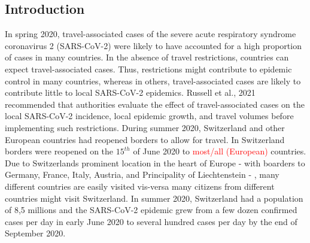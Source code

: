 \documentclass[10pt, a4paper, twoside]{article}
\begin{document}
\begin{multicols}{2}
\section{Introduction}
In spring 2020, travel-associated cases of the severe acute respiratory syndrome coronavirus 2 (SARS-CoV-2) were likely to have accounted for a high proportion of cases in many countries.\cite{russell_effect_2021} 
In the absence of travel restrictions, countries can expect travel-associated cases.\cite{russell_effect_2021} 
Thus, restrictions might contribute to epidemic control in many countries, whereas in others, travel-associated cases are likely to contribute little to local SARS-CoV-2 epidemics.\cite{russell_effect_2021}  
Russell et al., 2021 recommended that authorities evaluate the effect of travel-associated cases on the local SARS-CoV-2 incidence, local epidemic growth, and travel volumes before implementing such restrictions.\cite{russell_effect_2021} 
During summer 2020, Switzerland and other European countries had reopened borders to allow for travel. In Switzerland borders were reopened on the $15^{th}$ of June 2020 to \textcolor{red}{most/all (European)} countries. 
Due to Switzerlands prominent location in the heart of Europe - with boarders to Germany, France, Italy, Austria, and Principality of Liechtenstein - , many different countries are easily visited vis-versa many citizens from different countries might visit Switzerland. 
In summer 2020, Switzerland had a population of 8,5 millions and the SARS-CoV-2 epidemic grew from a few dozen confirmed cases per day in early June 2020 to several hundred cases per day by the end of September 2020. 


\end{multicols}
\end{document}
